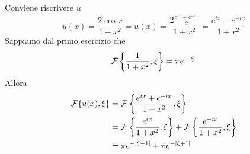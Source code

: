 Conviene riscrivere $u$
\begin{equation*}
u(x) = \frac{2\cos x}{1 + x^{2}} = u(x) = \frac{2\frac{e^{ix} + e^{ - ix}}{2}}{1 + x^{2}} = \frac{e^{ix} + e^{ - ix}}{1 + x^{2}}
\end{equation*}
Sappiamo dal primo esercizio che
\begin{equation*}
\mathcal{F} \left\{\frac{1}{1 + x^{2}} ,\xi \right\} = \pi e^{ - | \xi | }
\end{equation*}
Allora
\begin{equation*}
\begin{aligned}
\mathcal{F} \{u(x) ,\xi \} & = \mathcal{F} \left\{\frac{e^{ix} + e^{ - ix}}{1 + x^{2}} ,\xi \right\}\\
 & = \mathcal{F} \left\{\frac{e^{ix}}{1 + x^{2}} ,\xi \right\} + \mathcal{F} \left\{\frac{e^{ - ix}}{1 + x^{2}} ,\xi \right\}\\
 & = \pi e^{ - | \xi - 1| } + \pi e^{ - | \xi + 1| }
\end{aligned}
\end{equation*}
\Soluzione

